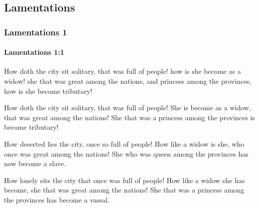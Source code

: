 \subsection{Lamentations}
	\label{LAMENTATIONS}

	\subsubsection{Lamentations 1} %
		\label{LAMENTATIONS-1}

		\paragraph{Lamentations 1:1} %
			\label{LAMENTATIONS-1-1}

			How doth the city sit solitary, that was full of people! how is she become as a widow! she that was great among the nations, and princess among the provinces, how is she become tributary!

			\begin{versebox}
					\item[BHS] 
					\item[LXX] 
					\item[ASV] How doth the city sit solitary, that was full of people! She is become as a widow, that was great among the nations! She that was a princess among the provinces is become tributary!
					\item[NIV] How deserted lies the city, once so full of people! How like a widow is she, who once was great among the nations! She who was queen among the provinces has now become a slave.
					\item[NRSV] How lonely sits the city that once was full of people! How like a widow she has become, she that was great among the nations! She that was a princess among the provinces has become a vassal.
			\end{versebox}

